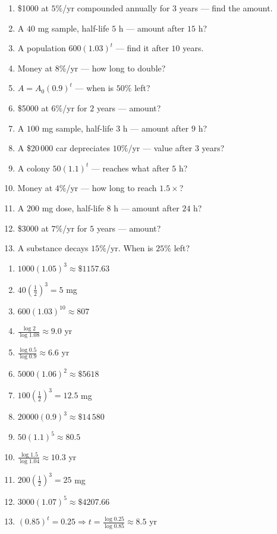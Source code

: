 \documentclass[11pt]{article}
\begin{document}
\begin{recapbox}
\begin{multicols}{2}
\small
\begin{enumerate}[leftmargin=*,itemsep=3pt]
  \item \$1000 at $5\%$/yr compounded annually for $3$ years — find the amount.
  \item A $40$ mg sample, half-life $5$ h — amount after $15$ h?
  \item A population $600(1.03)^{t}$ — find it after $10$ years.
  \item Money at $8\%$/yr — how long to double?
  \item $A=A_0(0.9)^{t}$ — when is $50\%$ left?
  \item \$5000 at $6\%$/yr for $2$ years — amount?
  \item A $100$ mg sample, half-life $3$ h — amount after $9$ h?
  \item A \$20\,000 car depreciates $10\%$/yr — value after $3$ years?
  \item A colony $50(1.1)^{t}$ — reaches what after $5$ h?
  \item Money at $4\%$/yr — how long to reach $1.5\times$?
  \item A $200$ mg dose, half-life $8$ h — amount after $24$ h?
  \item \$3000 at $7\%$/yr for $5$ years — amount?
  \item A substance decays $15\%$/yr. When is $25\%$ left?
\end{enumerate}
\end{multicols}
\end{recapbox}

\begin{keybox}
\begin{multicols}{2}
\small
\begin{enumerate}[leftmargin=*,itemsep=3pt]
  \item $1000(1.05)^3\approx\$1157.63$
  \item $40\left(\tfrac12\right)^3=5$ mg
  \item $600(1.03)^{10}\approx807$
  \item $\tfrac{\log 2}{\log 1.08}\approx9.0$ yr
  \item $\tfrac{\log 0.5}{\log 0.9}\approx6.6$ yr
  \item $5000(1.06)^2\approx\$5618$
  \item $100\left(\tfrac12\right)^3=12.5$ mg
  \item $20000(0.9)^3\approx\$14\,580$
  \item $50(1.1)^5\approx80.5$
  \item $\tfrac{\log 1.5}{\log 1.04}\approx10.3$ yr
  \item $200\left(\tfrac12\right)^3=25$ mg
  \item $3000(1.07)^5\approx\$4207.66$
  \item $(0.85)^t=0.25\Rightarrow t=\tfrac{\log 0.25}{\log 0.85}\approx8.5$ yr
\end{enumerate}
\end{multicols}
\end{keybox}
\end{document}
